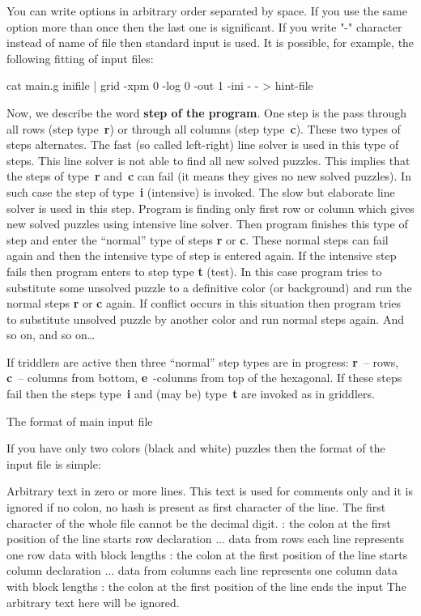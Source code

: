 \par\egroup \medskip

You can write options in arbitrary order separated by space.
If you use the same option more than once then the last one 
is significant. If you write "-" character instead of name of file
then standard input is used. It is possible, for example, the
following fitting of input files:

\begtt
cat main.g inifile | grid -xpm 0 -log 0 -out 1 -ini - - > hint-file
\endtt

Now, we describe the word {\bf step of the program}. One step is the
pass through all rows (step type~{\bf r}) or through all columns (step
type~{\bf c}). These two types of steps alternates. The fast (so called
left-right) line solver is used in this type of steps. This line
solver is not able to find all new solved puzzles. This implies that
the steps of type~{\bf r} and~{\bf c} can fail (it means they gives no new solved
puzzles). In such case the step of type~{\bf i} (intensive) is invoked.
The slow but elaborate line solver is used in this step. 
Program is finding only first row or column which gives
new solved puzzles using intensive line solver. Then program 
finishes this type of step and enter the ``normal'' type of steps
{\bf r} or {\bf c}. These normal steps can fail again and then the 
intensive type of step is entered again. If the intensive step
fails then program enters to step type {\bf t} (test). In this case 
program tries to substitute some unsolved puzzle to a definitive
color (or background) and run the normal steps {\bf r} or {\bf c} again.
If conflict occurs in this situation then program tries to substitute
unsolved puzzle by another color and run normal steps again.
And so on, and so on\dots

If triddlers are active then three ``normal'' step types are in progress:
{\bf r}~-- rows, {\bf c}~-- columns from bottom, {\bf e}~-columns from
top of the hexagonal. If these steps fail then the steps type~{\bf i}
and (may be) type~{\bf t} are invoked as in griddlers.


\tit The format of main input file

If you have only two colors (black and white) puzzles then the format
of the input file is simple:

\begtt
Arbitrary text in zero or more lines. This text is used for comments
only and it is ignored if no colon, no hash is present as first
character of the line. 
The first character of the whole file cannot be the decimal digit.
: the colon at the first position of the line starts row declaration
... data from rows
    each line represents one row data with block lengths
: the colon at the first position of the line starts column declaration
... data from columns
    each line represents one column data with block lengths    
: the colon at the first position of the line ends the input
The arbitrary text here will be ignored.
\endtt

